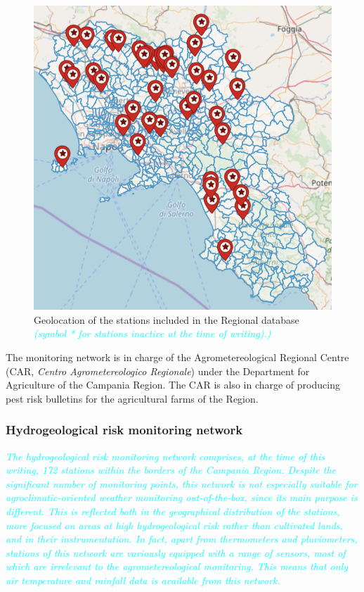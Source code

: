 \documentclass[authoryear,preprint,review,12pt]{elsarticle}
\newcommand{\review}[1]{\emph{\textcolor{cyan}{#1}}}
\begin{document}
\begin{figure}
	\centering
	\includegraphics[scale=.8]{figures/rarLocations}
	\caption{ Geolocation of the stations included in the Regional database \review{(symbol * for stations inactive at the time of writing).)}}
	\label{fig:rarLocations}
\end{figure}

The monitoring network is in charge of the Agrometereological Regional Centre (CAR, \emph{Centro Agrometereologico Regionale}) under the Department for Agriculture of the Campania Region. The CAR is also in charge of producing pest risk bulletins for the agricultural farms of the Region.

\subsubsection{Hydrogeological risk monitoring network\label{DPCNetwork}}
\review{ The hydrogeological risk monitoring network comprises, at the time of this writing, 172 stations within the borders of the Campania Region. Despite the significant number of monitoring points, this network is not especially suitable for agroclimatic-oriented weather monitoring out-of-the-box, since its main purpose is different. This is reflected both in the geographical distribution of the stations, more focused on areas at high hydrogeological risk rather than cultivated lands, and in their instrumentation. In fact, apart from thermometers and pluviometers, stations of this network are variously equipped with a range of sensors, most of which are irrelevant to the agrometereological monitoring. This means that only air temperature and rainfall data is available from this network.}
\end{document}
